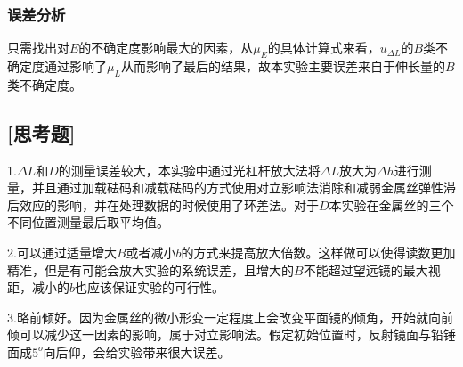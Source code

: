 \documentclass[UTF8]{article} %
\begin{document}
\subsubsection*{误差分析}
\par 只需找出对$E$的不确定度影响最大的因素，从$\mu_E$的具体计算式来看，$u_{\Delta  L}$的$B$类不确定度通过影响了$\mu_L$从而影响了最后的结果，故本实验主要误差来自于伸长量的$B$类不确定度。
\subsection*{[思考题]}
\par 1.$\Delta L$和$D$的测量误差较大，本实验中通过光杠杆放大法将$\Delta L$放大为$\Delta h$进行测量，并且通过加载砝码和减载砝码的方式使用对立影响法消除和减弱金属丝弹性滞后效应的影响，并在处理数据的时候使用了环差法。对于$D$本实验在金属丝的三个不同位置测量最后取平均值。
\par 2.可以通过适量增大$B$或者减小$b$的方式来提高放大倍数。这样做可以使得读数更加精准，但是有可能会放大实验的系统误差，且增大的$B$不能超过望远镜的最大视距，减小的$b$也应该保证实验的可行性。
\par 3.略前倾好。因为金属丝的微小形变一定程度上会改变平面镜的倾角，开始就向前倾可以减少这一因素的影响，属于对立影响法。假定初始位置时，反射镜面与铅锤面成$5^o$向后仰，会给实验带来很大误差。
\end{document}
